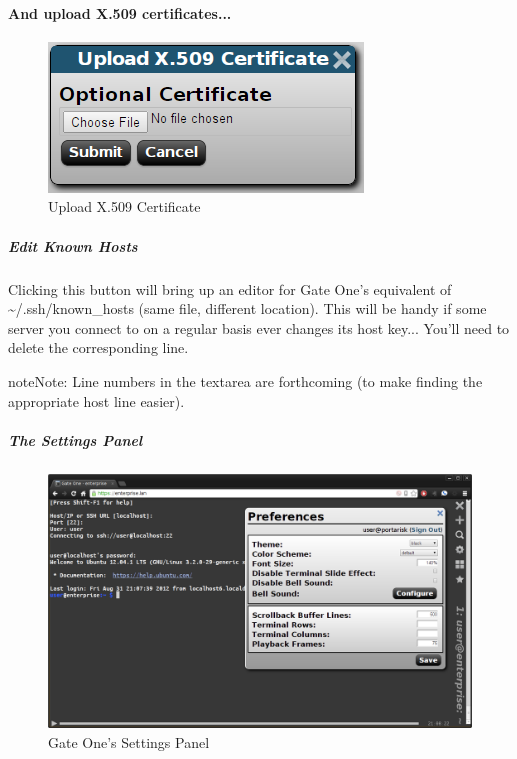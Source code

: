 \documentclass[letterpaper,10pt,openany]{sphinxmanual}
\begin{document}
\paragraph{And upload X.509 certificates...}
\begin{figure}[htbp]
\centering
\capstart

\includegraphics{gateone_upload_x509.png}
\caption{Upload X.509 Certificate}\end{figure}


\subparagraph{Edit Known Hosts}
\label{Applications/terminal/userguide:edit-known-hosts}
Clicking this button will bring up an editor for Gate One's equivalent of \textasciitilde{}/.ssh/known\_hosts (same file, different location).  This will be handy if some server you connect to on a regular basis ever changes its host key...  You'll need to delete the corresponding line.

\begin{notice}{note}{Note:}
Line numbers in the textarea are forthcoming (to make finding the appropriate host line easier).
\end{notice}


\subparagraph{The Settings Panel}
\label{Applications/terminal/userguide:the-settings-panel}\begin{figure}[htbp]
\centering
\capstart

\includegraphics{gateone_settingspanel.png}
\caption{Gate One's Settings Panel}\end{figure}
\end{document}
